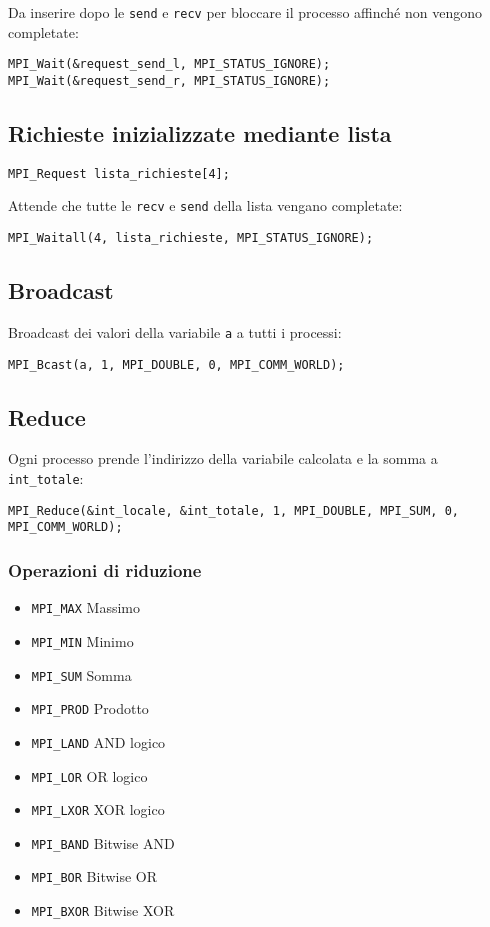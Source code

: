\documentclass[a4paper,12pt]{article}
\begin{document}
Da inserire dopo le \texttt{send} e \texttt{recv} per bloccare il processo affinché non vengono completate:
\begin{verbatim}
MPI_Wait(&request_send_l, MPI_STATUS_IGNORE);
MPI_Wait(&request_send_r, MPI_STATUS_IGNORE);
\end{verbatim}

\subsection{Richieste inizializzate mediante lista}
\begin{lstlisting}
MPI_Request lista_richieste[4];
\end{lstlisting}

Attende che tutte le \texttt{recv} e \texttt{send} della lista vengano completate:
\begin{lstlisting}
MPI_Waitall(4, lista_richieste, MPI_STATUS_IGNORE);
\end{lstlisting}

\subsection{Broadcast}
Broadcast dei valori della variabile \texttt{a} a tutti i processi:
\begin{lstlisting}
MPI_Bcast(a, 1, MPI_DOUBLE, 0, MPI_COMM_WORLD);
\end{lstlisting}

\subsection{Reduce}
Ogni processo prende l'indirizzo della variabile calcolata e la somma a \texttt{int\_totale}:
\begin{lstlisting}
MPI_Reduce(&int_locale, &int_totale, 1, MPI_DOUBLE, MPI_SUM, 0, MPI_COMM_WORLD);
\end{lstlisting}

\subsubsection{Operazioni di riduzione}
\begin{itemize}
    \item \texttt{MPI\_MAX} Massimo
    \item \texttt{MPI\_MIN} Minimo
    \item \texttt{MPI\_SUM} Somma
    \item \texttt{MPI\_PROD} Prodotto
    \item \texttt{MPI\_LAND} AND logico
    \item \texttt{MPI\_LOR} OR logico
    \item \texttt{MPI\_LXOR} XOR logico
    \item \texttt{MPI\_BAND} Bitwise AND
    \item \texttt{MPI\_BOR} Bitwise OR
    \item \texttt{MPI\_BXOR} Bitwise XOR
\end{itemize}
\end{document}
